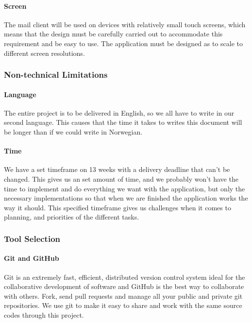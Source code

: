 \paragraph{Screen}
The mail client will be used on devices with relatively small touch screens, which means that the design must be carefully carried out to accommodate this requirement and be easy to use. The application must be designed as to scale to different screen resolutions. 

\subsubsection{Non-technical Limitations}

\paragraph{Language}
The entire project is to be delivered in English, so we all have to write in our second language. This causes that the time it takes to writes this document will be longer than if we could write in Norwegian.

\paragraph{Time}
We have a set timeframe on 13 weeks with a delivery deadline that can’t be changed. This gives us an set amount of time, and we probably won’t have the time to implement and do everything we want with the application, but only the necessary implementations so that when we are finished the application works the way it should. This specified timeframe gives us challenges when it comes to planning, and priorities of the different tasks.

\subsubsection{Tool Selection}

\paragraph{Git and GitHub}
Git is an extremely fast, efficient, distributed version control system ideal for the collaborative development of software and GitHub is the best way to collaborate with others. Fork, send pull requests and manage all your public and private git repositories. We use git to make it easy to share and work with the same source codes through this project.


